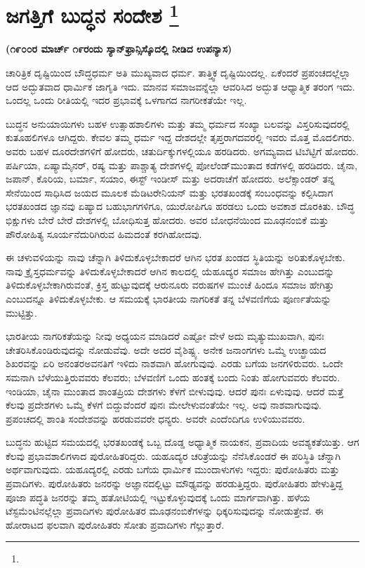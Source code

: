 
\chapter[ಜಗತ್ತಿಗೆ ಬುದ್ಧನ ಸಂದೇಶ ]{ಜಗತ್ತಿಗೆ ಬುದ್ಧನ ಸಂದೇಶ \protect\footnote{}}

\centerline{\textbf{(೧೯೦೦ರ ಮಾರ್ಚ್​ ೧೯ರಂದು ಸ್ಯಾನ್​ಫ್ರಾನ್ಸಿಸ್ಕೊದಲ್ಲಿ ನೀಡಿದ ಉಪನ್ಯಾಸ)}}

ಚಾರಿತ್ರಿಕ ದೃಷ್ಟಿಯಿಂದ ಬೌದ್ಧಧರ್ಮ ಅತಿ ಮುಖ್ಯವಾದ ಧರ್ಮ.\- ತಾತ್ತ್ವಿಕ ದೃಷ್ಟಿಯಿಂದಲ್ಲ. ಏಕೆಂದರೆ ಪ್ರಪಂಚದಲ್ಲೆಲ್ಲಾ ಆದ ಅದ್ಭುತವಾದ ಧಾರ್ಮಿಕ ಜಾಗೃತಿ ಇದು. ಮಾನವ ಸಮಾಜವನ್ನೆಲ್ಲಾ ಆವರಿಸಿದ ಅದ್ಭುತ ಆಧ್ಯಾತ್ಮಿಕ ತರಂಗ ಇದು. ಒಂದಲ್ಲ ಒಂದು ರೀತಿಯಲ್ಲಿ ಇದರ ಪ್ರಭಾವಕ್ಕೆ ಒಳಗಾಗದ ನಾಗರೀಕತೆಯೇ ಇಲ್ಲ.

ಬುದ್ಧನ ಅನುಯಾಯಿಗಳು ಬಹಳ ಉತ್ಸಾಹಶಾಲಿಗಳು ಮತ್ತು ತಮ್ಮ ಧರ್ಮದ ಸಂಖ್ಯಾ ಬಲವನ್ನು ವಿಸ್ತರಿಸುವುದರಲ್ಲಿ ಕುತೂಹಲಿಗಳೂ ಆಗಿದ್ದರು. ಕೇವಲ ತಮ್ಮ ಧರ್ಮ ಇದ್ದ ದೇಶದಲ್ಲೇ ತೃಪ್ತರಾಗದವರಲ್ಲಿ ಇವರು ಮೊತ್ತ ಮೊದಲಿಗರು. ಅವರು ಬಹಳ ದೂರದೇಶಗಳಿಗೆ ಹೋದರು, ಚತುರ್ದಿಕ್ಕುಗಳಲ್ಲಿಯೂ ಹರಡಿದರು. ಅಗಮ್ಯವಾದ ಟಿಬೆಟ್ಟಿಗೆ ಹೋದರು. ಪರ್ಷಿಯಾ, ಏಷ್ಯಾಮೈನರ್​, ರಷ್ಯ ಮತ್ತು ಪಾಶ್ಚಾತ್ಯ ದೇಶಗಳಲ್ಲಿ ಪೋಲೆಂಡ್​ ಮುಂತಾದ ಕಡೆಗಳಲ್ಲಿ ಹರಡಿದರು. ಚೈನಾ, ಜಪಾನ್​, ಕೊರಿಯ, ಬರ್ಮಾ, ಸಯಾಂ, ಈಸ್ಟ್​ ಇಂಡೀಸ್​ ಮತ್ತು ಅದರಾಚೆಗೆ ಹೋದರು. ಅಲೆಕ್ಸಾಂಡರ್​ ತನ್ನ ಸೇನೆಯಿಂದ ಸಾಧಿಸಿದ ಜಯದ ಮೂಲಕ ಮೆಡಿಟರೇನಿಯನ್​ ಮತ್ತು ಭರತಖಂಡಕ್ಕೆ ಸಂಬಂಧವನ್ನು ಕಲ್ಪಿಸಿದಾಗ ಭರತಖಂಡದ ಜ್ಞಾನವು ಏಷ್ಯಾದ ಬಹುಭಾಗಗಳಿಗೂ, ಯುರೋಪಿಗೂ ಹರಡಲು ಒಂದು ಅವಕಾಶ ದೊರಕಿತು. ಬೌದ್ಧ ಭಿಕ್ಷುಗಳು ಬೇರೆ ಬೇರೆ ದೇಶಗಳಲ್ಲಿ ಬೋಧಿಸುತ್ತ ಹೋದರು. ಅವರ ಬೋಧನೆಯಿಂದ ಮೂಢನಂಬಿಕೆ ಮತ್ತು ಪೌರೋಹಿತ್ಯ ಸೂರ್ಯನೆದುರಿಗಿರುವ ಹಿಮದಂತೆ ಕರಗಿಹೋದವು.

ಈ ಚಳುವಳಿಯನ್ನು ನಾವು ಚೆನ್ನಾಗಿ ತಿಳಿದುಕೊಳ್ಳಬೇಕಾದರೆ ಆಗಿನ ಭರತ ಖಂಡದ ಸ್ಥಿತಿಯನ್ನು ಅರಿತುಕೊಳ್ಳಬೇಕು. ನಾವು ಕ್ರೈಸ್ತಧರ್ಮವನ್ನು ತಿಳಿದುಕೊಳ್ಳಬೇಕಾದರೆ ಆಗಿನ ಕಾಲದಲ್ಲಿ ಯೆಹೂದ್ಯರ ಸಮಾಜ ಹೇಗಿತ್ತು ಎಂಬುದನ್ನು ತಿಳಿದುಕೊಳ್ಳಬೇಕಾಗಿರುವಂತೆ, ಕ್ರಿಸ್ತ ಹುಟ್ಟುವುದಕ್ಕೆ ಆರುನೂರು ವರುಷಗಳ ಮುಂಚೆ ಹಿಂದೂ ಸಮಾಜ ಹೇಗಿತ್ತು ಎಂಬುದನ್ನೂ ತಿಳಿದುಕೊಳ್ಳಬೇಕು. ಆ ಸಮಯಕ್ಕೆ ಭಾರತೀಯ ನಾಗರಿಕತೆ ತನ್ನ ಬೆಳವಣಿಗೆಯ ಪೂರ್ಣತೆಯನ್ನು ಮುಟ್ಟಿತ್ತು.

ಭಾರತೀಯ ನಾಗರಿಕತೆಯನ್ನು ನೀವು ಅಧ್ಯಯನ ಮಾಡಿದರೆ ಎಷ್ಟೋ ವೇಳೆ ಅದು ಮೃತ್ಯುಮುಖವಾಗಿ, ಪುನಃ ಚೇತರಿಸಿಕೊಂಡಿರುವುದನ್ನು ನೋಡುವೆವು. ಅದೇ ಅದರ ವೈಶಿಷ್ಟ್ಯ. ಅನೇಕ ಜನಾಂಗಗಳು ಒಮ್ಮೆ ಉಚ್ಛ್ರಾಯದ ಶಿಖರವನ್ನು ಏರಿ ಅನಂತರ\break ಅವನತಿಗೆ ಇಳಿದು ನಾಶವಾಗಿ ಹೋಗುವುವು. ಎರಡು ಬಗೆಯ ಜನಗಳಿರುವರು. ಒಂದೇ ಸಮನಾಗಿ ಬೆಳೆಯುತ್ತಿರುವವರು ಕೆಲವರು; ಬೆಳವಣಿಗೆ ಒಂದು ಹಂತಕ್ಕೆ ಬಂದು ನಿಂತು ಹೋಗುವವರು ಕೆಲವರು. ಇಂಡಿಯಾ, ಚೈನಾ ಮುಂತಾದ ಶಾಂತಪ್ರಿಯ ದೇಶಗಳು ಕೆಳಗೆ ಬೀಳುವುವು. ಆದರೆ ಪುನಃ ಏಳುವುವು. ಆದರೆ ಮತ್ತೆ ಕೆಲವು ಪ್ರದೇಶಗಳು ಒಮ್ಮೆ ಕೆಳಗೆ ಬಿದ್ದುವೆಂದರೆ ಪುನಃ ಮೇಲೇಳುವಂತೆಯೇ ಇಲ್ಲ. ಅವು ನಾಶವಾಗುವುವು. ಪ್ರಪಂಚದಲ್ಲಿ ಶಾಂತಿ ಸಂದೇಶವನ್ನು ಹರಡುವವರೇ ಧನ್ಯರು. ಅವರೇ ಎಂದೆಂದಿಗೂ ಉಳಿಯುವವರು.

ಬುದ್ಧನು ಹುಟ್ಟಿದ ಸಮಯದಲ್ಲಿ ಭರತಖಂಡಕ್ಕೆ ಒಬ್ಬ ದೊಡ್ಡ ಅಧ್ಯಾತ್ಮಿಕ ನಾಯಕನ, ಪ್ರವಾದಿಯ ಅವಶ್ಯಕತೆಯಿತ್ತು. ಆಗ ಕೆಲವು ಪ್ರಭಾವಶಾಲಿಗಳಾದ ಪುರೋಹಿತರಿದ್ದರು. ಯಹೂದ್ಯರ ಚರಿತ್ರೆಯನ್ನು ನೆನೆಸಿಕೊಂಡರೆ ಈ ಪರಿಸ್ಥಿತಿ ಚೆನ್ನಾಗಿ ಅರ್ಥವಾಗುವುದು. ಯಹೂದ್ಯರಲ್ಲಿ ಎರಡು ಬಗೆಯ ಧಾರ್ಮಿಕ ಮುಂದಾಳುಗಳು ಇದ್ದರು: ಪುರೋಹಿತರು ಮತ್ತು ಪ್ರವಾದಿಗಳು. ಪುರೋಹಿತರು ಜನರನ್ನು ಅಜ್ಞಾನದಲ್ಲಿಟ್ಟು ಮೌಢ್ಯವನ್ನು ಹರಡು\-ತ್ತಿದ್ದರು. ಪುರೋಹಿತರು ಹೇಳುತ್ತಿದ್ದ ಪೂಜಾ ಪದ್ಧತಿ ಜನರನ್ನು ತಮ್ಮ ಹತೋಟಿಯಲ್ಲಿ ಇಟ್ಟುಕೊಳ್ಳುವುದಕ್ಕೆ ಒಂದು ಮಾರ್ಗವಾಗಿತ್ತು. ಹಳೆಯ ಟೆಸ್ಟಮೆಂಟಿನಲ್ಲೆಲ್ಲಾ ಪ್ರವಾದಿಗಳು ಪುರೋಹಿತರ ಮೂಢನಂಬಿಕೆಗಳನ್ನು ಧಿಕ್ಕರಿಸುವುದನ್ನು ನೋಡು\-ತ್ತೇವೆ. ಈ ಹೋರಾಟದ ಫಲವಾಗಿ ಪುರೋಹಿತರು ಸೋತು ಪ್ರವಾದಿಗಳು ಗೆಲ್ಲುತ್ತಾರೆ.

